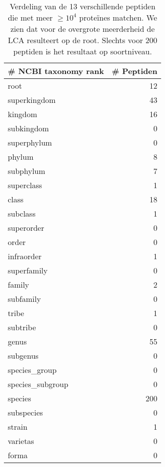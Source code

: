 \begin{table}[h!]
    \centering
    \begin{tabular}{|l|r|}
        \hline
        \textbf{\# NCBI taxonomy rank} & \textbf{\# Peptiden} \\ \hline
        root & 12\thinspace369 \\ \hline
        superkingdom & 43 \\ \hline
        kingdom & 16 \\ \hline
        subkingdom & 0 \\ \hline
        superphylum & 0 \\ \hline
        phylum & 8 \\ \hline
        subphylum & 7 \\ \hline
        superclass & 1 \\ \hline
        class & 18 \\ \hline
        subclass & 1 \\ \hline
        superorder & 0 \\ \hline
        order & 0 \\ \hline
        infraorder & 1 \\ \hline
        superfamily & 0 \\ \hline
        family & 2 \\ \hline
        subfamily & 0 \\ \hline
        tribe & 1 \\ \hline
        subtribe & 0 \\ \hline
        genus & 55 \\ \hline
        subgenus & 0 \\ \hline
        species\_group & 0 \\ \hline
        species\_subgroup & 0 \\ \hline
        species & 200 \\ \hline
        subspecies & 0 \\ \hline
        strain & 1 \\ \hline
        varietas & 0 \\ \hline
        forma & 0 \\ \hline
    \end{tabular}
    \caption{Verdeling van de 13 verschillende peptiden die met meer $\geq 10^4$ proteïnes matchen. We zien dat voor de overgrote meerderheid de LCA resulteert op de root. Slechts voor 200 peptiden is het resultaat op soortniveau.}
    \label{tab:peptides_distribution}
\end{table}

